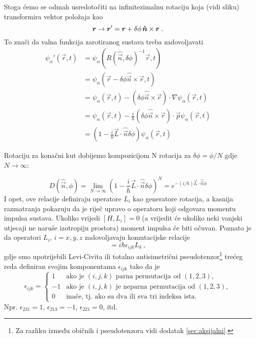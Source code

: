 \centerline{}

Stoga ćemo se odmah usredotočiti na infinitezimalnu rotaciju koja (vidi sliku)
transformira vektor položaja kao
  \begin{equation}
  \vec{r}\to\vec{r}'=\vec{r}+\delta\phi\, \unitn\times\vec{r}  \;.
 \end{equation}
To znači da valna funkcija zarotiranog
sustava treba zadovoljavati
\begin{equation}
\begin{split}
\psi_{\alpha}'(\vec{r}, t)&=\psi_{\alpha}(R(\hat{\vec{n}},\delta \phi)^{-1}
\vec{r}, t) \\
 &=\psi_{\alpha}(\vec{r}-\delta\phi\hat{\vec{n}}\times\vec{r}, t) \\
 &=\psi_{\alpha}(\vec{r}, t)-(\delta\phi\hat{\vec{n}}\times\vec{r})\cdot
  \nabla\psi_{\alpha}(\vec{r}, t) \\
 &= \psi_{\alpha}(\vec{r}, t)-\frac{i}{\hbar}(\delta\phi\hat{\vec{n}}\times
  \vec{r})\cdot \vec{p}\psi_{\alpha}(\vec{r}, t) \\
 &= \left(1-\frac{i}{\hbar}\vec{L}\cdot\hat{\vec{n}}\delta\phi \right)
  \psi_{\alpha}(\vec{r}, t)
\end{split}
\end{equation}

Rotaciju za konačni kut dobijemo kompozicijom N rotacija za $\delta\phi = \phi / N$
gdje $N\to\infty$:

\begin{equation}
D(\hat{\vec{n}}, \phi)=\lim_{N\to\infty}
\left(1-\frac{i}{\hbar}\vec{L}\cdot\hat{\vec{n}}\delta\phi \right)^N
= e^{-(i/\hbar)\vec{L}\cdot\hat{\vec{n}}\phi}
\label{eq:rotD}
\end{equation}
I opet, ove relacije definiraju operatore $L_i$ kao generatore rotacija,
a kasnija razmatranja pokazuju da je riječ upravo o operatoru koji
odgovara momentu impulsa sustava.
Ukoliko vrijedi $[H,L_{i}]=0$ (a vrijedit će ukoliko neki vanjski utjecaji
ne naruše izotropiju prostora) moment impulsa će biti očuvan.
Poznato je da operatori $L_i$, $i=x,y,z$ zadovoljavaju komutacijske relacije
\begin{equation}
    [L_i, L_j] = i\hbar \epsilon_{ijk}  L_k \,,
    \label{eq:Lkomutacija}
\end{equation}
gdje smo upotrijebili Levi-Civita ili totalno antisimetrični pseudotenzor\footnote{Za
razliku između običnih i pseudotenzora vidi dodatak \ref{sec:aksijalni}.}
trećeg reda definiran
svojim komponentama $\epsilon_{ijk}$ tako da je
\begin{displaymath}
\epsilon_{ijk}=
\begin{cases}
1& \text{ako je $(i,j,k)$ parna permutacija od $(1,2,3)$}, \\
-1& \text{ako je $(i,j,k)$ je neparna permutacija od $(1,2,3)$}, \\
0& \text{inače, tj. ako su dva ili sva tri indeksa ista}.
\end{cases} 
\end{displaymath}
Npr. $\epsilon_{231}=1$, $\epsilon_{213}=-1$, $\epsilon_{221}=0$, itd.

